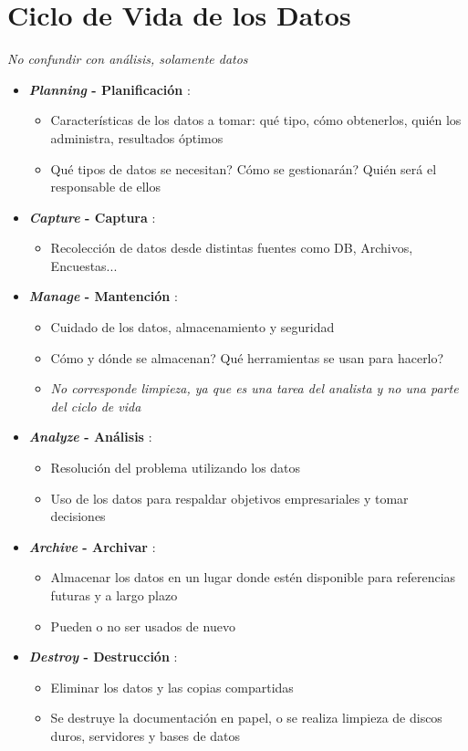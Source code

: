 \section{Ciclo de Vida de los Datos}

\textit{No confundir con análisis, solamente datos}

\begin{itemize}
    \item {\textbf{\textit{Planning} - Planificación} :
    \begin{itemize}
        \item {Características de los datos a tomar: qué tipo, cómo obtenerlos, quién los administra, resultados óptimos}
        \item {Qué tipos de datos se necesitan? Cómo se gestionarán? Quién será el responsable de ellos}
    \end{itemize}}
    \item {\textbf{\textit{Capture} - Captura} :
    \begin{itemize}
        \item {Recolección de datos desde distintas fuentes como DB, Archivos, Encuestas...}
    \end{itemize}}
    \item {\textbf{\textit{Manage} - Mantención} :
    \begin{itemize}
        \item {Cuidado de los datos, almacenamiento y seguridad}
        \item {Cómo y dónde se almacenan? Qué herramientas se usan para hacerlo?}
        \item {\textit{No corresponde limpieza, ya que es una tarea del analista y no una parte del ciclo de vida}}
    \end{itemize}}
    \item {\textbf{\textit{Analyze} - Análisis} :
    \begin{itemize}
        \item {Resolución del problema utilizando los datos}
        \item {Uso de los datos para respaldar objetivos empresariales y tomar decisiones}
    \end{itemize}}
    \item {\textbf{\textit{Archive} - Archivar} :
    \begin{itemize}
        \item {Almacenar los datos en un lugar donde estén disponible para referencias futuras y a largo plazo}
        \item {Pueden o no ser usados de nuevo}
    \end{itemize}}
    \item {\textbf{\textit{Destroy} - Destrucción} :
    \begin{itemize}
       \item {Eliminar los datos y las copias compartidas}
       \item {Se destruye la documentación en papel, o se realiza limpieza de discos duros, servidores y bases de datos}
    \end{itemize}}
\end{itemize}


